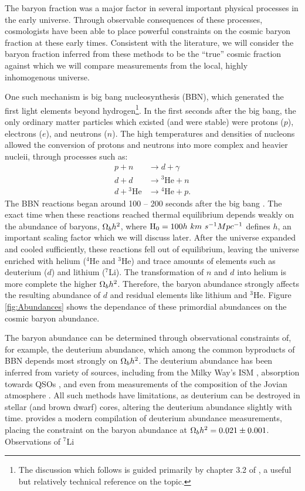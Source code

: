 The baryon fraction was a major factor in several important physical
processes in the early universe. Through observable consequences of
these processes, cosmologists have been able to place powerful
constraints on the cosmic baryon fraction at these early
times. Consistent with the literature, we will consider the baryon
fraction inferred from these methods to be the ``true'' cosmic
fraction against which we will compare measurements from the local,
highly inhomogenous universe.

One such mechanism is big bang nucleosynthesis (BBN), which generated
the first light elements beyond hydrogen\footnote{The discussion which
  follows is guided primarily by chapter 3.2 of \citet{Weinberg2008},
  a useful but relatively technical reference on the topic.}. In the
first seconds after the big bang, the only ordinary matter particles
which existed (and were stable) were protons ($p$), electrons
($e$), and neutrons ($n$). The high temperatures and densities of
nucleons allowed the conversion of protons and neutrons into more
complex and heavier nucleii, through processes such as:
\begin{align}
p + n &\rightarrow{} d + \gamma \nonumber \\
d + d &\rightarrow{} ^3\textrm{He} + n \nonumber \\
d +{} ^3\textrm{He} &\rightarrow{} ^4\textrm{He} + p .\nonumber
\end{align}
The BBN reactions began around 100 -- 200 seconds after the big bang
\citep{Weinberg2008}. The exact time when these reactions reached
thermal equilibrium depends weakly on the abundance of baryons,
$\Omega_b h^2$, where $\textrm{H\ensuremath{_0}} = 100h~km~s^{-1} Mpc^{-1}$ defines $h$, an
important scaling factor which we will discuss later. After the
universe expanded and cooled sufficiently, these reactions fell out of
equilibrium, leaving the universe enriched with helium ($^4$He and
$^3$He) and trace amounts of elements such as deuterium ($d$) and
lithium ($^7$Li). The transformation of $n$ and $d$ into helium is
more complete the higher $\Omega_b h^2$. Therefore, the baryon
abundance strongly affects the resulting abundance of $d$ and residual
elements like lithium and $^3$He. Figure \ref{fig:Abundances} shows
the dependance of these primordial abundances on the cosmic baryon
abundance.

The baryon abundance can be determined through observational
constraints of, for example, the deuterium abundance, which among the
common byproducts of BBN depends most strongly on $\Omega_b h^2$. The
deuterium abundance has been inferred from variety of sources,
including from the Milky Way's ISM \citep{Linsky1993, Linsky1995},
absorption towards QSOs \citep{Tytler1996, Kirkman2003}, and even from
measurements of the composition of the Jovian atmosphere
\citep{Niemann1996}. All such methods have limitations, as deuterium
can be destroyed in stellar (and brown dwarf) cores, altering the
deuterium abundance slightly with time. \citet{Iocco2009} provides a
modern compilation of deuterium abundance measurements, placing the
constraint on the baryon abundance at $\Omega_b h^2 = 0.021 \pm
0.001$. Observations of $^7$Li 



